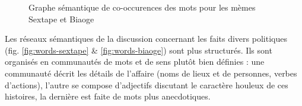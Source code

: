 \begin{figure}[ht]
    \centering
    
  \caption{
    Graphe s\'emantique de co-occurences des mots pour les m\`emes Sextape et Biaoge
  }
\end{figure}


Les r\'eseaux s\'emantiques de la discussion concernant les faits divers
politiques (fig. \ref{fig:words-sextape} \& \ref{fig:words-biaoge}) sont plus structur\'es. Ils sont organis\'es en
communaut\'es de mots et de sens plut\^ot bien d\'efinies : une
communaut\'e d\'ecrit les d\'etails de l{\textquoteright}affaire (noms
de lieux et de personnes, verbes d{\textquoteright}actions),
l{\textquoteright}autre se compose d{\textquoteright}adjectifs
discutant le caract\`ere houleux de ces histoires, la derni\`ere est
faite de mots plus anecdotiques. 


